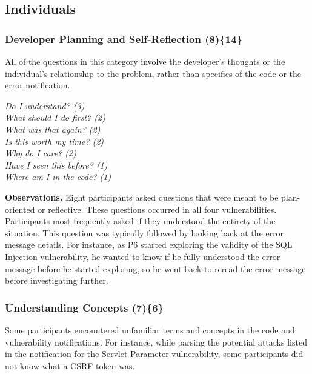 \documentclass{acm_proc_article-sp}
\begin{document}
\subsection{Individuals}
\label{sec:results-i}



\subsubsection{\textbf{Developer Planning and Self-Reflection (8)\{14\}}} \label{dpr}
 
All of the questions in this category involve the developer's thoughts or the individual's relationship to the problem, rather than specifics of the code or the error notification.


\noindent\emph{Do I understand? (3)} \\
\emph{What should I do first? (2)} \\
\emph{What was that again? (2)} \\
\emph{Is this worth my time? (2)} \\
\emph{Why do I care? (2)} \\
\emph{Have I seen this before? (1)} \\
\emph{Where am I in the code? (1)} 


\noindent\textbf{Observations.}
Eight participants asked questions that were meant to be plan-oriented or reflective.
These questions occurred in all four vulnerabilities.
Participants most frequently asked if they understood the entirety of the situation. 
This question was typically followed by looking back at the error message details. 
For instance, as P6 started exploring the validity of the SQL Injection vulnerability, he wanted to know if he fully understood the error message before he started exploring, so he went back to reread the error message before investigating further.



\subsubsection{\textbf{Understanding Concepts (7)\{6\}}}\label{uc}

Some participants encountered unfamiliar terms and concepts in the code and vulnerability notifications.
For instance, while parsing the potential attacks listed in the notification for the Servlet Parameter vulnerability, some participants did not know what a CSRF token was.
\end{document}

